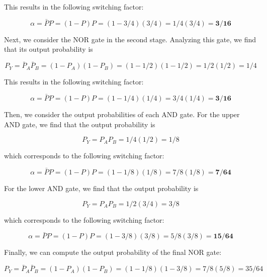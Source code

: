\documentclass[fleqn]{article}
\begin{document}
\begin{enumerate}
\begin{enumerate}
			This results in the following switching factor:
			
			\begin{equation*}
				\alpha = \bar{P}P = (1 - P)P = (1 - 3/4)(3/4) = 1/4(3/4) = \mathbf{3/16}
			\end{equation*}
			
			Next, we consider the NOR gate in the second stage. Analyzing this gate, we find that its output probability is
			
			\begin{equation*}
				P_Y = \bar{P}_A\bar{P}_B = (1 - P_A)(1 - P_B) = (1 - 1/2)(1 - 1/2) = 1/2(1/2) = 1/4
			\end{equation*}
			
			This results in the following switching factor:
			
			\begin{equation*}
				\alpha = \bar{P}P = (1 - P)P = (1 - 1/4)(1/4) = 3/4(1/4) = \mathbf{3/16}
			\end{equation*}
			
			Then, we consider the output probabilities of each AND gate. For the upper AND gate, we find that the output probability is
			
			\begin{equation*}
				P_Y = P_AP_B = 1/4(1/2) = 1/8
			\end{equation*}
			
			which corresponds to the following switching factor:
			
			\begin{equation*}
				\alpha = \bar{P}P = (1 - P)P = (1 - 1/8)(1/8) = 7/8(1/8) = \mathbf{7/64}
			\end{equation*}
			
			For the lower AND gate, we find that the output probability is
			
			\begin{equation*}
				P_Y = P_AP_B = 1/2(3/4) = 3/8
			\end{equation*}
			
			which corresponds to the following switching factor:
			
			\begin{equation*}
				\alpha = \bar{P}P = (1 - P)P = (1 - 3/8)(3/8) = 5/8(3/8) = \mathbf{15/64}
			\end{equation*}
			
			Finally, we can compute the output probability of the final NOR gate:
			
			\begin{equation*}
				P_Y = \bar{P}_A\bar{P}_B = (1 - P_A)(1 - P_B) = (1 - 1/8)(1 - 3/8) = 7/8(5/8) = 35/64
			\end{equation*}
			

\end{enumerate}
\end{enumerate}
\end{document}
